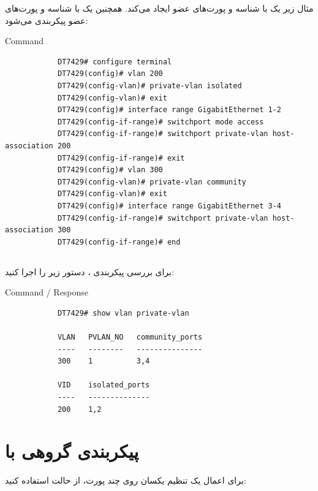 \documentclass[11pt,letterpaper]{report}
\begin{document}
	مثال زیر یک  با شناسه  و پورت‌های
	عضو  ایجاد می‌کند. همچنین یک
	 با شناسه  و پورت‌های عضو
	 پیکربندی می‌شود:

	\begin{LTR}
		\begin{cliexample}{Command}
			\begin{verbatim}
			DT7429# configure terminal
			DT7429(config)# vlan 200
			DT7429(config-vlan)# private-vlan isolated
			DT7429(config-vlan)# exit
			DT7429(config)# interface range GigabitEthernet 1-2
			DT7429(config-if-range)# switchport mode access
			DT7429(config-if-range)# switchport private-vlan host-association 200
			DT7429(config-if-range)# exit
			DT7429(config)# vlan 300
			DT7429(config-vlan)# private-vlan community
			DT7429(config-vlan)# exit
			DT7429(config)# interface range GigabitEthernet 3-4
			DT7429(config-if-range)# switchport private-vlan host-association 300
			DT7429(config-if-range)# end
			\end{verbatim}
		\end{cliexample}
	\end{LTR}

	\subsection{\lr{Verification}}

	برای بررسی پیکربندی ، دستور زیر را اجرا کنید:

	\begin{LTR}
		\begin{cliexample}{Command / Response}
			\begin{verbatim}
			DT7429# show vlan private-vlan

			VLAN   PVLAN_NO   community_ports
			----   --------   ---------------
			300    1          3,4

			VID    isolated_ports
			----   --------------
			200    1,2
			\end{verbatim}
		\end{cliexample}
	\end{LTR}

	\section{پیکربندی گروهی با }

	برای اعمال یک تنظیم یکسان روی چند پورت، از حالت
	 استفاده کنید:
\end{document}

